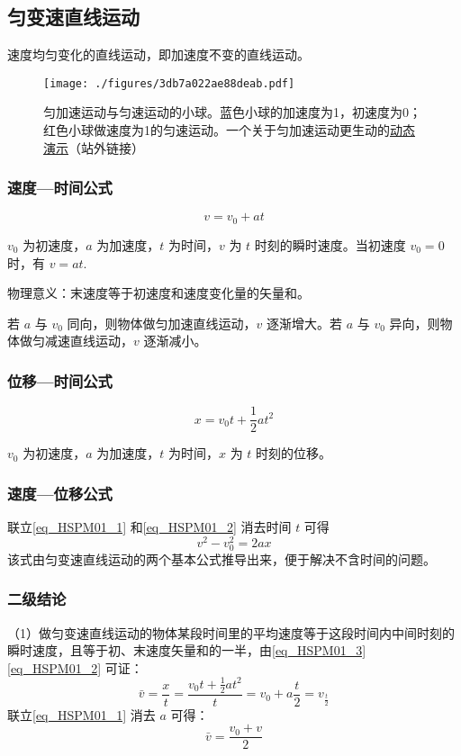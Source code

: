 \subsection{匀变速直线运动}
速度均匀变化的直线运动，即加速度不变的直线运动。
\begin{figure}[ht]
\centering
\texttt{[image: ./figures/3db7a022ae88deab.pdf]}
\caption{匀加速运动与匀速运动的小球。蓝色小球的加速度为1，初速度为0；红色小球做速度为1的匀速运动。一个关于匀加速运动更生动的\href{https://www.geogebra.org/m/kX9C9yDw}{动态演示}（站外链接）} \label{fig_HSPM01_1}
\end{figure}
\subsubsection{速度—时间公式}
\begin{equation}\label{eq_HSPM01_1}
v= v_0+ a t
\end{equation}

$v_0$ 为初速度，$a$ 为加速度，$t$ 为时间，$v$ 为 $t$ 时刻的瞬时速度。当初速度 $v_0=0$ 时，有 $v=a t$.

物理意义：末速度等于初速度和速度变化量的矢量和。

若 $a$ 与 $v_0$ 同向，则物体做匀加速直线运动，$v$ 逐渐增大。若 $a$ 与 $v_0$ 异向，则物体做匀减速直线运动，$v$ 逐渐减小。

\subsubsection{位移—时间公式}
\begin{equation}\label{eq_HSPM01_2}
x=v_0 t+\frac12 at^2
\end{equation}

$v_0$ 为初速度，$a$ 为加速度，$t$ 为时间，$x$ 为 $t$ 时刻的位移。

\subsubsection{速度—位移公式}
联立\autoref{eq_HSPM01_1} 和\autoref{eq_HSPM01_2} 消去时间 $t$ 可得
\begin{equation}\label{eq_HSPM01_4}
v^2-v_0^2=2ax
\end{equation}
该式由匀变速直线运动的两个基本公式推导出来，便于解决不含时间的问题。

\subsubsection{二级结论}
（1）做匀变速直线运动的物体某段时间里的平均速度等于这段时间内中间时刻的瞬时速度，且等于初、末速度矢量和的一半，由\autoref{eq_HSPM01_3} \autoref{eq_HSPM01_2} 可证：
\begin{equation}
\bar v=\frac xt=\frac{v_0t+\frac 12at^2}{t}=v_0+a\frac t2=v_{\frac t2}
\end{equation}
联立\autoref{eq_HSPM01_1} 消去 $a$ 可得：
\begin{equation}
\bar v=\frac{v_0+v}{2}
\end{equation}

